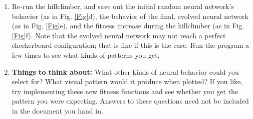 \documentclass[12pt]{article}
\begin{document}
\begin{enumerate}
\item Re-run the hillclimber, and save out the initial random neural network's behavior (as in Fig. \ref{Fig}d), the behavior of the final, evolved neural network (as in Fig. \ref{Fig}e), and the fitness increase during the hillclimber (as in Fig. \ref{Fig}f). Note that the evolved neural network may not reach a perfect checkerboard configuration; that is fine if this is the case. Run the program a few times to see what kinds of patterns you get.

\item \textbf{Things to think about:} What other kinds of neural behavior could you select for? What visual pattern would it produce when plotted? If you like, try implementing these new fitness functions and see whether you get the pattern you were expecting. Answers to these questions need not be included in the document you hand in.

\end{enumerate}
\end{document}
